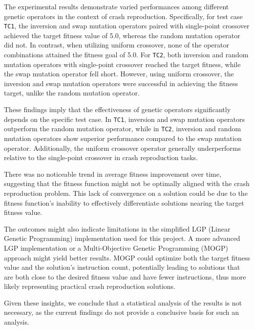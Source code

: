     The experimental results demonstrate varied performances among different genetic operators in the context of crash 
    reproduction. Specifically, for test case \texttt{TC1}, the inversion and swap mutation operators paired with 
    single-point crossover achieved the target fitness value of 5.0, whereas the random mutation operator did not. In 
    contrast, when utilizing uniform crossover, none of the operator combinations attained the fitness goal of 5.0. For 
    \texttt{TC2}, both inversion and random mutation operators with single-point crossover reached the target fitness, 
    while the swap mutation operator fell short. However, using uniform crossover, the inversion and swap mutation 
    operators were successful in achieving the fitness target, unlike the random mutation operator.

    These findings imply that the effectiveness of genetic operators significantly depends on the specific test case. In 
    \texttt{TC1}, inversion and swap mutation operators outperform the random mutation operator, while in \texttt{TC2}, 
    inversion and random mutation operators show superior performance compared to the swap mutation operator. 
    Additionally, the uniform crossover operator generally underperforms relative to the single-point crossover in crash 
    reproduction tasks.

    There was no noticeable trend in average fitness improvement over time, suggesting that the fitness function might 
    not be optimally aligned with the crash reproduction problem. This lack of convergence on a solution could be due to 
    the fitness function's inability to effectively differentiate solutions nearing the target fitness value.

    The outcomes might also indicate limitations in the simplified LGP (Linear Genetic Programming) implementation used 
    for this project. A more advanced LGP implementation or a Multi-Objective Genetic Programming (MOGP) approach might 
    yield better results. MOGP could optimize both the target fitness value and the solution's instruction count, 
    potentially leading to solutions that are both close to the desired fitness value and have fewer instructions, thus 
    more likely representing practical crash reproduction solutions.

    Given these insights, we conclude that a statistical analysis of the results is not necessary, as the current 
    findings do not provide a conclusive basis for such an analysis.

